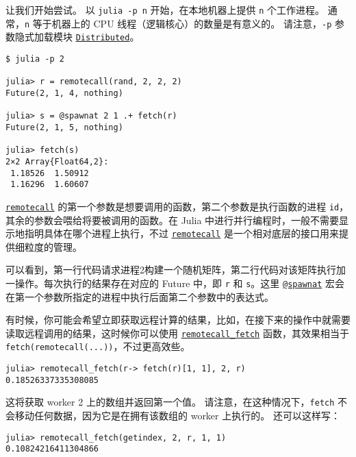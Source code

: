 让我们开始尝试。 以 \texttt{julia -p n} 开始，在本地机器上提供 \texttt{n} 个工作进程。 通常，\texttt{n} 等于机器上的 CPU 线程（逻辑核心）的数量是有意义的。 请注意，\texttt{-p} 参数隐式加载模块 \hyperlink{11988382873486720115}{\texttt{Distributed}}。




\begin{verbatim}
$ julia -p 2

julia> r = remotecall(rand, 2, 2, 2)
Future(2, 1, 4, nothing)

julia> s = @spawnat 2 1 .+ fetch(r)
Future(2, 1, 5, nothing)

julia> fetch(s)
2×2 Array{Float64,2}:
 1.18526  1.50912
 1.16296  1.60607
\end{verbatim}



\hyperlink{5405028821457292937}{\texttt{remotecall}} 的第一个参数是想要调用的函数，第二个参数是执行函数的进程 \texttt{id}，其余的参数会喂给将要被调用的函数。在 Julia 中进行并行编程时，一般不需要显示地指明具体在哪个进程上执行，不过 \hyperlink{5405028821457292937}{\texttt{remotecall}} 是一个相对底层的接口用来提供细粒度的管理。



可以看到，第一行代码请求进程2构建一个随机矩阵，第二行代码对该矩阵执行加一操作。每次执行的结果存在对应的 Future 中，即 \texttt{r} 和 \texttt{s}。这里 \hyperlink{11231712027010946923}{\texttt{@spawnat}} 宏会在第一个参数所指定的进程中执行后面第二个参数中的表达式。



有时候，你可能会希望立即获取远程计算的结果，比如，在接下来的操作中就需要读取远程调用的结果，这时候你可以使用 \hyperlink{17262349333771600150}{\texttt{remotecall\_fetch}} 函数，其效果相当于 \texttt{fetch(remotecall(...))}，不过更高效些。




\begin{verbatim}
julia> remotecall_fetch(r-> fetch(r)[1, 1], 2, r)
0.18526337335308085
\end{verbatim}



这将获取 worker 2 上的数组并返回第一个值。 请注意，在这种情况下，\texttt{fetch} 不会移动任何数据，因为它是在拥有该数组的 worker 上执行的。 还可以这样写：




\begin{verbatim}
julia> remotecall_fetch(getindex, 2, r, 1, 1)
0.10824216411304866
\end{verbatim}



